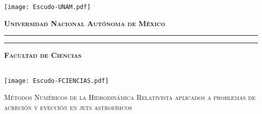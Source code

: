 \documentclass[letterpaper,12pt,oneside]{book}
\begin{document}
    \begin{titlepage}
        \thispagestyle{empty}
        \begin{minipage}[c][0.17\textheight][c]{0.25\textwidth}
            \begin{center}
                \texttt{[image: Escudo-UNAM.pdf]}
            \end{center}
        \end{minipage}
        \begin{minipage}[c][0.195\textheight][t]{0.75\textwidth}
            \begin{center}
                \vspace{0.3cm}
                \textbf{\textsc{\large Universidad Nacional Aut\'onoma de M\'exico}}\\[0.5cm]
                \vspace{0.3cm}
                \hrule height2.5pt
                \vspace{.2cm}
                \hrule height1pt
                \vspace{1.2cm}
                \textbf{\textsc{\large Facultad de Ciencias}}\\[0.5cm] %
            \end{center}
        \end{minipage}

        \begin{minipage}[c][0.81\textheight][t]{0.25\textwidth}
            \vspace*{5mm}
            \begin{center}
                \hskip2.0mm
                \vrule width1pt height13cm 
                \vspace{5mm}
                \hskip2pt
                \vrule width2.5pt height13cm
                \hskip2mm
                \vrule width1pt height13cm \\
                \vspace{5mm}
                \texttt{[image: Escudo-FCIENCIAS.pdf]}
            \end{center}
        \end{minipage}
        \begin{minipage}[c][0.81\textheight][t]{0.75\textwidth}
            \begin{center}
                \vspace{0.5cm}

                {\large\scshape Métodos Numéricos de la Hidrodinámica Relativista aplicados a problemas de acreción y eyección en jets astrofísicos}


\end{center}
\end{minipage}
\end{titlepage}
\end{document}
